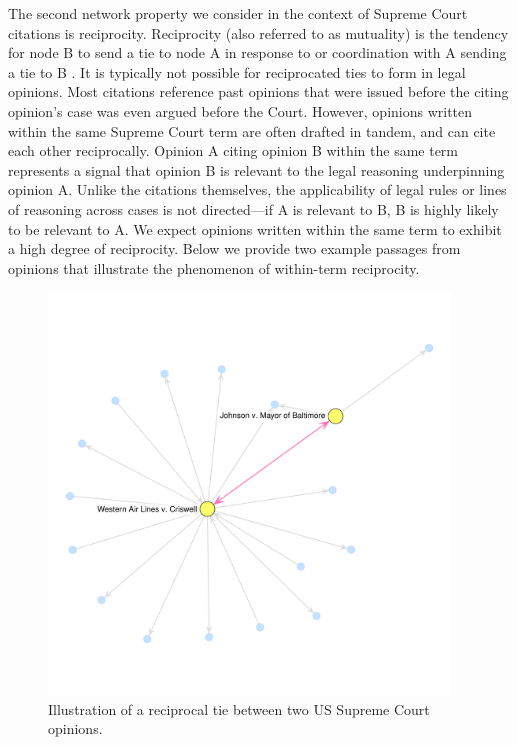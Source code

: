\documentclass[headsepline=true, abstracton]{scrartcl}
\begin{document}
The second network property we consider in the context of Supreme Court citations is reciprocity. Reciprocity (also referred to as mutuality) is the tendency for node B to send a tie to node A in response to or coordination with A sending a tie to B \citep{garlaschelli2004patterns}. It is typically not possible for reciprocated ties to form in legal opinions. Most citations reference past opinions that were issued before the citing opinion's case was even argued before the Court.  However, opinions written within the same Supreme Court term are often drafted in tandem, and can cite each other reciprocally.  Opinion A citing opinion B within the same term represents a signal that opinion B is relevant to the legal reasoning underpinning opinion A. Unlike the citations themselves, the applicability of legal rules or lines of reasoning across cases is not directed---if A is relevant to B, B is highly likely to be relevant to A. We expect opinions written within the same term to exhibit a high degree of reciprocity. Below we provide two example passages from opinions that illustrate the phenomenon of within-term reciprocity.  

\begin{figure}[htp]
\centering
\includegraphics[width = 0.95\textwidth,trim= 0cm 1cm 0cm 2cm,clip=true ]{images/citations_recip.pdf}
\caption{Illustration of a reciprocal tie between two US Supreme Court opinions.}
\label{fig:reciprocity}
\end{figure}
\end{document}
